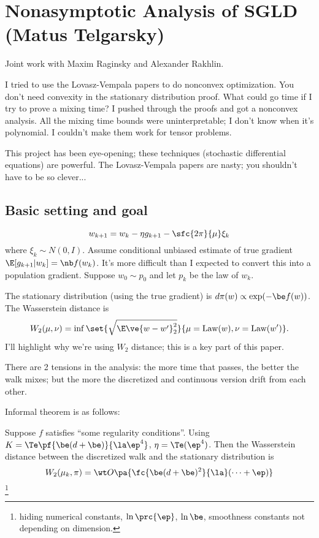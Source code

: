 \section{Nonasymptotic Analysis of SGLD (Matus Telgarsky)}

Joint work with Maxim Raginsky and Alexander Rakhlin.

I tried to use the Lovasz-Vempala papers to do nonconvex optimization. You don't need convexity in the stationary distribution proof. What could go time if I try to prove a mixing time? I pushed through the proofs and got a nonconvex analysis. All the mixing time bounds were uninterpretable; I don't know when it's polynomial. 
I couldn't make them work for tensor problems.

This project has been eye-opening; these techniques (stochastic differential equations) are powerful.
The Lovasz-Vempala papers are nasty; you shouldn't have to be so clever...

\subsection{Basic setting and goal}
$$
w_{k+1} = w_k - \eta g_{k+1} - \sfc{2\pi}{\mu}  \xi_k
$$
where $\xi_k\sim N(0,I)$.
Assume conditional unbiased estimate of true gradient $\E[g_{k+1}|w_k] = \nb f(w_k)$. 
It's more difficult than I expected to convert this into a population gradient.
Suppose $w_0\sim p_0$ and let $p_k$ be the law of $w_k$. 


The stationary distribution (using the true gradient) is $d\pi(w) \propto \exp(-\be f(w))$. %
The Wasserstein distance is
$$
W_2(\mu, \nu) = \inf\set{\sqrt{\E\ve{w-w'}_2^2}}{\mu = \text{Law}(w), \nu = \text{Law}(w')}.
$$
I'll highlight why we're using $W_2$ distance; this is a key part of this paper.
 

There are 2 tensions in the analysis: the more time that passes, the better the walk mixes; but the more the discretized and continuous version drift from each other.

Informal theorem is as follows:
\begin{thm}
 Suppose $f$ satisfies ``some regularity conditions''.
Using $K= \Te\pf{\be (d+\be)}{\la \ep^4}$, $\eta=\Te(\ep^4)$. Then the Wasserstein distance between the discretized walk and the stationary distribution is
$$
W_2(\mu_k, \pi) = \wt O\pa{\fc{\be(d+\be)^2}{\la} (\cdots+\ep)}
$$
\footnote{hiding numerical constants, $\ln \prc{\ep}$, $\ln \be$, smoothness constants not depending on dimension.}
\end{thm}

